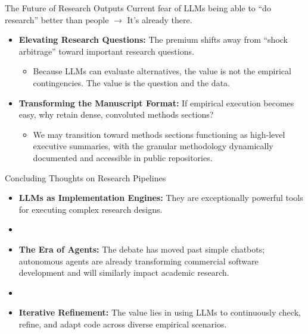 \documentclass[xcolor=x11names,compress,9pt]{beamer}
\renewcommand{\(}{\begin{columns}}
\renewcommand{\)}{\end{columns}}
\newcommand{\<}[1]{\begin{column}{#1}}
\renewcommand{\>}{\end{column}}
\begin{document}
\begin{frame}{The Future of Research Outputs}
    Current fear of LLMs being able to ``do research'' better than people $\to$ It's already there. 
    \vspace{0.4cm}
    \begin{itemize}
        \item \textbf{Elevating Research Questions:} The premium shifts away from ``shock arbitrage'' toward important research questions.
        \begin{itemize}
            \item Because LLMs can evaluate alternatives, the value is not the empirical contingencies. The value is the question and the data. 
        \end{itemize}
        \item \textbf{Transforming the Manuscript Format:} If empirical execution becomes easy, why retain dense, convoluted methods sections?
        \begin{itemize}
            \item We may transition toward methods sections functioning as high-level executive summaries, with the granular methodology dynamically documented and accessible in public repositories.
        \end{itemize}
    \end{itemize}
\end{frame}

\begin{frame}{Concluding Thoughts on Research Pipelines}
    \begin{itemize}
        \item \textbf{LLMs as Implementation Engines:} They are exceptionally powerful tools for executing complex research designs.
        \item []
        \item \textbf{The Era of Agents:} The debate has moved past simple chatbots; autonomous agents are already transforming commercial software development and will similarly impact academic research.
        \item []
        \item \textbf{Iterative Refinement:} The value lies in using LLMs to continuously check, refine, and adapt code across diverse empirical scenarios.
    \end{itemize}
\end{frame}
    
\end{document}
